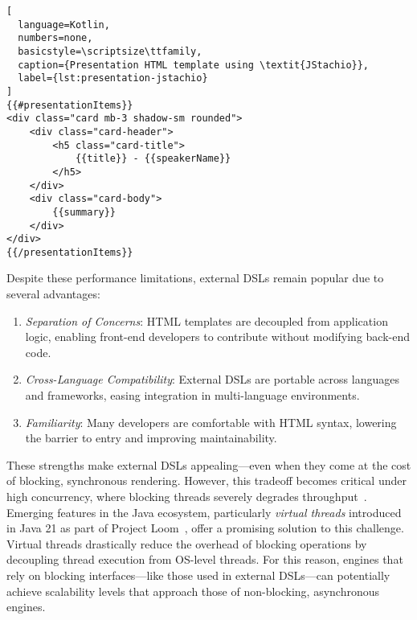 \begin{center}
\begin{minipage}{0.70\textwidth}
\begin{lstlisting}[
  language=Kotlin,
  numbers=none,
  basicstyle=\scriptsize\ttfamily,
  caption={Presentation HTML template using \textit{JStachio}},
  label={lst:presentation-jstachio}
]
{{#presentationItems}}
<div class="card mb-3 shadow-sm rounded">
    <div class="card-header">
        <h5 class="card-title">
            {{title}} - {{speakerName}}
        </h5>
    </div>
    <div class="card-body">
        {{summary}}
    </div>
</div>
{{/presentationItems}}
\end{lstlisting}
\end{minipage}
\end{center}

Despite these performance limitations, external DSLs remain popular due to
several advantages:

\begin{enumerate}
    \item \emph{Separation of Concerns}: HTML templates are decoupled from application logic, enabling front-end developers to contribute without modifying back-end code.
    \item \emph{Cross-Language Compatibility}: External DSLs are portable across languages and frameworks, easing integration in multi-language environments.
    \item \emph{Familiarity}: Many developers are comfortable with HTML syntax, lowering the barrier to entry and improving maintainability.
\end{enumerate}

These strengths make external DSLs appealing—even when they come at the cost of
blocking, synchronous rendering. However, this tradeoff becomes critical under
high concurrency, where blocking threads severely degrades throughput~\cite{wise2024pssr}.
Emerging features in the Java ecosystem, particularly \textit{virtual threads}
introduced in Java 21 as part of Project Loom~\cite{Veen2024}, offer a promising solution to
this challenge. Virtual threads drastically reduce the overhead of blocking
operations by decoupling thread execution from OS-level threads. For this reason,
engines that rely on blocking interfaces—like those used in
external DSLs—can potentially achieve scalability levels that approach those of
non-blocking, asynchronous engines.

